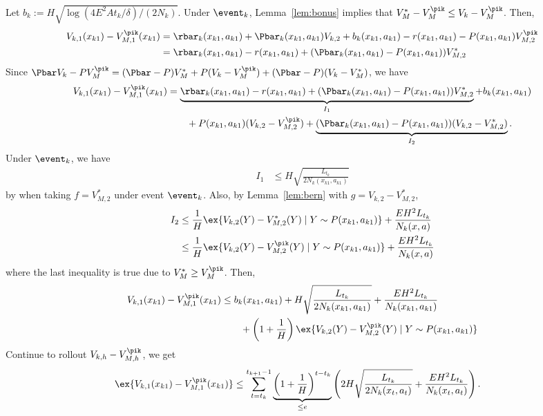 Let $b_k:=H\sqrt{\log(4E^2At_k/\delta)/(2N_k)}$. Under $\event_k$, Lemma~\ref{lem:bonus} implies that $V_M^*-V_M^{\pik} \le V_{k}-V_M^{\pik}$.
Then,
\begin{align*}
V_{k,1}(x_{k1}) -V_{M,1}^{\pik}(x_{k1})
&=\rbar_k(x_{k1},a_{k1}) +\Pbar_k(x_{k1},a_{k1})V_{k,2} +b_k(x_{k1},a_{k1}) -r(x_{k1},a_{k1}) -P(x_{k1},a_{k1})V_{M,2}^{\pik} \\
&=\rbar_k(x_{k1},a_{k1}) -r(x_{k1},a_{k1}) +(\Pbar_k(x_{k1},a_{k1}) -P(x_{k1},a_{k1}))V_{M,2}^*
\end{align*}
Since $\Pbar V_k -PV_M^{\pik}=(\Pbar-P)V_M^* +P(V_k-V_M^{\pik}) +(\Pbar-P)(V_k-V_M^*)$, we have
\begin{align*}
V_{k,1}(x_{k1}) -V_{M,1}^{\pik}(x_{k1})
&=\underbrace{\rbar_k(x_{k1},a_{k1}) -r(x_{k1},a_{k1}) +(\Pbar_k(x_{k1},a_{k1}) -P(x_{k1},a_{k1}))V_{M,2}^*}_{I_1} +b_k(x_{k1},a_{k1}) \\
&\qquad +P(x_{k1},a_{k1})(V_{k,2}-V_{M,2}^{\pik}) +\underbrace{(\Pbar_k(x_{k1},a_{k1})-P(x_{k1},a_{k1}))(V_{k,2}-V_{M,2}^*)}_{I_2}.
\end{align*}
Under $\event_k$, we have
\begin{align*}
I_1&\le H\sqrt{\frac{L_{t_k}}{2N_k(x_{k1},a_{k1})}}
\end{align*}
by when taking $f=V_{M,2}^{*}$ under event $\event_k$.
Also, by Lemma~\ref{lem:bern} with $g=V_{k,2} -V_{M,2}^{*}$,
\begin{align*}
I_2
&\le\frac1{H}\ex{V_{k,2}(Y) -V_{M,2}^{*}(Y) \mid Y\sim P(x_{k1}, a_{k1})} +\frac{EH^2L_{t_k}}{N_k(x,a)} \\
&\le\frac1{H}\ex{V_{k,2}(Y) -V_{M,2}^{\pik}(Y) \mid Y\sim P(x_{k1}, a_{k1})} +\frac{EH^2L_{t_k}}{N_k(x,a)}
\end{align*}
where the last inequality is true due to $V^*_M\ge V^{\pik}_{M}$.
Then,
\begin{align*}
V_{k,1}(x_{k1}) -V_{M,1}^{\pik}(x_{k1})
&\le b_k(x_{k1},a_{k1}) +H\sqrt{\frac{L_{t_k}}{2N_k(x_{k1},a_{k1})}} +\frac{EH^2L_{t_k}}{N_k(x_{k1},a_{k1})} \\
&\qquad +\left(1+\frac1H\right)\ex{V_{k,2}(Y) -V_{M,2}^{\pik}(Y) \mid Y\sim P(x_{k1}, a_{k1})}
\end{align*}
Continue to rollout $V_{k,h}-V_{M,h}^{\pik}$, we get
\begin{align*}
\ex{V_{k,1}(x_{k1})-V_{M,1}^{\pik}(x_{k1})}
&\le\sum_{t=t_k}^{t_{k+1}-1}\underbrace{\left(1+\frac1H\right)^{t-t_k}}_{\le e} \left(2H\sqrt{\frac{L_{t_k}}{2N_k(x_t,a_t)}} +\frac{EH^2L_{t_k}}{N_k(x_t,a_t)}\right).
\end{align*}
